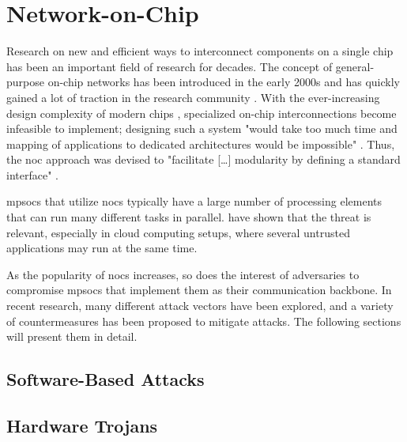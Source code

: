 \section{Network-on-Chip}\label{sec:networkonchip}
Research on new and efficient ways to interconnect components on a single chip has been an important field of research for decades. The concept of
general-purpose on-chip networks has been introduced in the early 2000s
\cites{dally01routepacketsnotwires}{kumar02networkonchip}{benini02nocparadigm} and has quickly gained a lot of traction in the research community
\cite[e.g.][]{ivanov05nocintroduction}. With the ever-increasing design complexity of modern chips \cite{mack11mooreslaw}, specialized on-chip
interconnections become infeasible to implement; designing such a system "would take too much time and mapping of applications to dedicated architectures would
be impossible" \cite[1]{kumar02networkonchip}. Thus, the \gls{noc} approach was devised to "facilitate […] modularity by defining a
standard interface" \cite[1]{dally01routepacketsnotwires}.

\Glspl{mpsoc} that utilize \glspl{noc} typically have a large number of processing elements that can run many different
tasks in parallel. \citeauthor{ancajas14fortnocs} have shown that the threat is relevant, especially in cloud computing setups, where several
untrusted applications may run at the same time. \cite{ancajas14fortnocs} %

As the popularity of \glspl{noc} increases, so does the interest of adversaries to compromise \glspl{mpsoc} that implement them as their communication
backbone. In recent research, many different attack vectors have been explored, and a variety of countermeasures has been proposed to mitigate
attacks. The following sections will present them in detail.

\subsection{Software-Based Attacks}\label{subsec:softwareattacks}

\subsection{Hardware Trojans}\label{subsec:hardwaretrojans}


